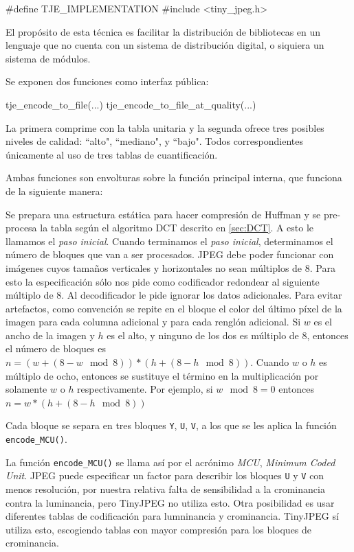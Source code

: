\label{alg:stb_impl}
\begin{code}[language=C][h]
    #define TJE_IMPLEMENTATION
    #include <tiny_jpeg.h>
\end{code}

El propósito de esta técnica es facilitar la distribución de bibliotecas en un
lenguaje que no cuenta con un sistema de distribución digital, o siquiera un
sistema de módulos.

Se exponen dos funciones como interfaz pública:

\begin{code}[language=C][h]
tje_encode_to_file(...)
tje_encode_to_file_at_quality(...)
\end{code}

La primera comprime con la tabla unitaria y la segunda ofrece tres posibles
niveles de calidad: ``alto", ``mediano", y ``bajo". Todos correspondientes
únicamente al uso de tres tablas de cuantificación.

Ambas funciones son envolturas sobre la función principal interna, que funciona
de la siguiente manera:

Se prepara una estructura estática para hacer compresión de Huffman y se
pre-procesa la tabla según el algoritmo DCT descrito en \ref{sec:DCT}. A esto
le llamamos el \emph{paso inicial}.  Cuando terminamos el \emph{paso inicial},
determinamos el número de bloques que van a ser procesados. JPEG debe poder
funcionar con imágenes cuyos tamaños verticales y horizontales no sean múltiplos
de 8. Para esto la especificación sólo nos pide como codificador redondear al
siguiente múltiplo de 8. Al decodificador le pide ignorar los datos adicionales. Para
evitar \gls{artefactos}, como convención se repite en el bloque el color del
último píxel de la imagen para cada columna adicional y para cada renglón adicional. Si
$w$ es el ancho de la imagen y $h$ es el alto, y ninguno de los dos es múltiplo
de 8, entonces el número de bloques es $n = (w + (8 - w \mod 8)) * (h + (8 - h
\mod 8))$. Cuando $w$ o $h$ es múltiplo de ocho, entonces se sustituye el
término en la multiplicación por solamente $w$ o $h$ respectivamente. Por
ejemplo, si $w \mod 8 = 0$ entonces $n = w * (h + (8 - h \mod 8))$

Cada bloque se separa en tres bloques \verb+Y+, \verb+U+, \verb+V+, a los que
se les aplica la función \verb+encode_MCU()+.

La función \verb+encode_MCU()+ se llama así por el acrónimo \emph{\gls{MCU}},
\emph{Minimum Coded Unit}. JPEG puede especificar un factor para describir los
bloques \verb+U+ y \verb+V+ con menos resolución, por nuestra relativa falta de
sensibilidad a la crominancia contra la luminancia, pero TinyJPEG no utiliza
esto. Otra posibilidad es usar diferentes tablas de codificación para
lumninancia y crominancia. TinyJPEG sí utiliza esto, escogiendo tablas con
mayor compresión para los bloques de crominancia.

